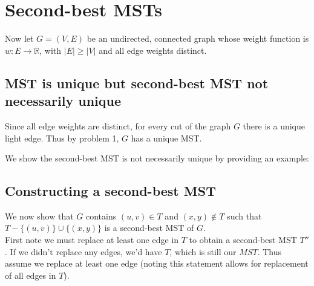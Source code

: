 \documentclass[paper=a4, fontsize=11pt]{scrartcl} %
\numberwithin{equation}{section} %
\numberwithin{figure}{section} %
\numberwithin{table}{section} %
\begin{document}

\section{Second-best MSTs}

Now let $G = (V, E)$ be an undirected, connected graph whose weight function is $w: E \to \mathbb{R}$, with $|E| \geq |V|$ and all edge weights distinct.

\subsection{MST is unique but second-best MST not necessarily unique}

Since all edge weights are distinct, for every cut of the graph $G$ there is a unique light edge. Thus by problem 1, $G$ has a unique MST.

We show the second-best MST is not necessarily unique by providing an example:

\begin{center}
\end{center}

\subsection{Constructing a second-best MST}

We now show that $G$ contains $(u, v) \in T$ and $(x,y) \notin T$ such that $T - \{(u,v)\} \cup \{(x,y)\}$ is a second-best MST of $G$. \\

First note we must replace at least one edge in $T$ to obtain a second-best MST $T''$. If we didn't replace any edges, we'd have $T$, which is still our $MST$. Thus assume we replace at least one edge (noting this statement allows for replacement of all edges in $T$).\\
\end{document}
